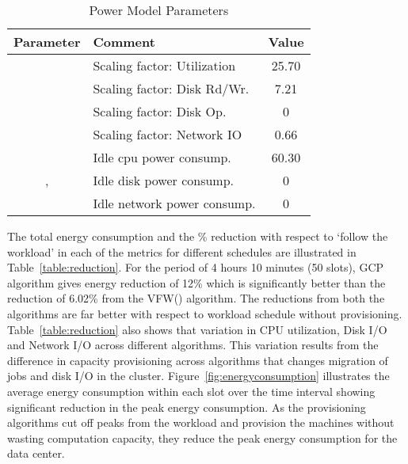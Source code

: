 \documentclass[10pt,conference,compsocconf,letterpaper]{IEEEtran}
\begin{document}
\begin{table}[!ht]
  \centering
  \caption{Power Model Parameters}
    \begin{tabular}{c|l|c}
    \hline\hline
    Parameter & Comment & Value   \\
    \hline
     &  Scaling factor: Utilization    &   25.70      \\
     &   Scaling factor: Disk Rd/Wr.     &   7.21        \\
     &  Scaling factor: Disk Op.     &      0     \\
     &  Scaling factor: Network IO     &      0.66      \\
     &   Idle cpu power consump.    &    60.30         \\
    ,  &  Idle disk power consump.    &    0      \\
     &   Idle network power consump.   &        0    \\
    \hline
    \end{tabular}\label{table:parameter}\end{table}




The total energy consumption and the \% reduction with respect to `follow the workload' in each of the metrics for different schedules are illustrated in Table~\ref{table:reduction}. For the period of 4 hours 10 minutes (50 slots), GCP algorithm gives energy reduction of 12\% which is significantly better than the reduction of 6.02\% from the VFW() algorithm. The reductions from both the algorithms are far better with respect to workload schedule without provisioning. Table~\ref{table:reduction} also shows that variation in CPU utilization, Disk I/O and Network I/O across different algorithms. This variation results from the difference in capacity provisioning across algorithms that changes migration of jobs and disk I/O in the cluster. Figure~\ref{fig:energyconsumption} illustrates the average energy consumption within each slot over the time interval showing significant reduction in the peak energy consumption. As the provisioning algorithms cut off peaks from the workload and provision the machines without wasting computation capacity, they reduce the peak energy consumption for the data center.
\end{document}
